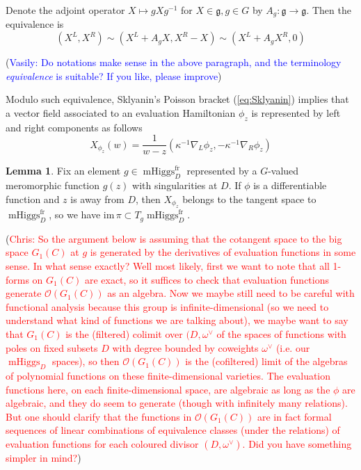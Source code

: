 \documentclass[11pt, oneside, reqno]{amsart}
\theoremstyle{definition} \newtheorem{definition}{Definition}[section]
\newtheorem{lemma}[definition]{Lemma}
\theoremstyle{definition} \newtheorem{remark}[definition]{Remark}
\theoremstyle{definition} \newtheorem{remarks}[definition]{Remarks}
\theoremstyle{definition} \newtheorem{question}[definition]{Question}
\theoremstyle{definition} \newtheorem*{note}{Note}
\theoremstyle{definition} \newtheorem{example}[definition]{Example}
\theoremstyle{definition} \newtheorem{examples}[definition]{Examples}
\renewcommand{\gg}{\mathfrak{g}}
\newcommand{\OO}{\mathcal{O}}
\DeclareMathOperator{\mhiggs}{mHiggs}
\newcommand{\fr}{\mathrm{fr}}
\newcommand{\chris}[1]{(\textcolor{red}{Chris: #1})}
\newcommand{\vasily}[1]{(\textcolor{blue}{Vasily: #1})}
\begin{document}
Denote the adjoint operator $X \mapsto g X g^{-1}$ for $X \in \gg, g \in G$ by $A_{g}: \gg \to \gg$.
Then the equivalence is
\begin{equation}
\label{eq:equivalence}
    (X^L, X^R) \sim (X^L + A_{g} X , X^{R} -  X) \sim (X^{L} +  A_{g} X^{R}, 0) 
\end{equation}

\vasily{Do notations make sense in the above paragraph, and the
  terminology \emph{equivalence} is suitable? If you like, please improve}


Modulo such equivalence, Sklyanin's Poisson bracket (\ref{eq:Sklyanin}) implies
that a vector field associated to an evaluation Hamiltonian $\phi_z$ is represented by
left and right components as follows 
\begin{equation}
\label{eq:Xphiz}
X_{\phi_z} (w) =  \frac{1}{w - z} ( \kappa^{-1} \nabla_{L} \phi_z,  - \kappa^{-1}\nabla_{R} \phi_{z})
\end{equation}


\begin{lemma}\label{phitoX}
  Fix an element $g \in \mhiggs^{\fr}_{D}$ represented by a $G$-valued
  meromorphic function $g(z)$ with singularities at $D$.    If $\phi$ is a differentiable function and $z$ is away from $D$, then $X_{\phi_z}$
  belongs to the tangent space to $\mhiggs^{\fr}_{D}$, so we have $\mathrm{im} \, \pi \subset T_{g}\mhiggs^{\fr}_D$. 
\end{lemma}

\chris{So the argument below is assuming that the cotangent space to the big space $G_1(C)$ at $g$ is generated by the derivatives of evaluation functions in some sense.  In what sense exactly?  Well most likely, first we want to note that all 1-forms on $G_1(C)$ are exact, so it suffices to check that evaluation functions generate $\OO(G_1(C))$ as an algebra.  Now we maybe still need to be careful with functional analysis because this group is infinite-dimensional (so we need to understand what kind of functions we are talking about), we maybe want to say that $G_1(C)$ is the (filtered) colimit over $(D,\omega^\vee$ of the spaces of functions with poles on fixed subsets $D$ with degree bounded by coweights $\omega^\vee$ (i.e. our $\mhiggs_D$ spaces), so then $\OO(G_1(C))$ is the (cofiltered) limit of the algebras of polynomial functions on these finite-dimensional varieties. The evaluation functions here, on each finite-dimensional space, are algebraic as long as the $\phi$ are algebraic, and they do seem to generate (though with infinitely many relations).  But one should clarify that the functions in $\OO(G_1(C))$ are in fact formal sequences of linear combinations of equivalence classes (under the relations) of evaluation functions for each coloured divisor $(D, \omega^\vee)$.  Did you have something simpler in mind?}
\end{document}

